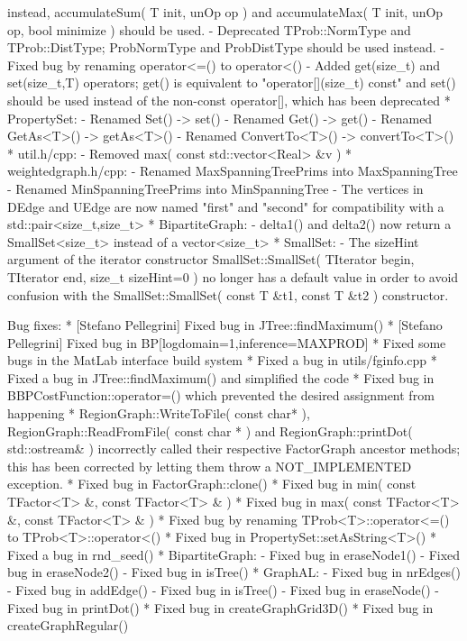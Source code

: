 \begin{DoxyVerbInclude}
    instead, accumulateSum( T init, unOp op ) and
    accumulateMax( T init, unOp op, bool minimize ) should be used.
  - Deprecated TProb::NormType and TProb::DistType;
    ProbNormType and ProbDistType should be used instead.
  - Fixed bug by renaming operator<=() to operator<()
  - Added get(size_t) and set(size_t,T) operators; 
    get() is equivalent to "operator[](size_t) const" and set() should
    be used instead of the non-const operator[], which has been deprecated
* PropertySet:
  - Renamed Set() -> set()
  - Renamed Get() -> get()
  - Renamed GetAs<T>() -> getAs<T>()
  - Renamed ConvertTo<T>() -> convertTo<T>()
* util.h/cpp:
  - Removed max( const std::vector<Real> &v )
* weightedgraph.h/cpp:
  - Renamed MaxSpanningTreePrims into MaxSpanningTree
  - Renamed MinSpanningTreePrims into MinSpanningTree
  - The vertices in DEdge and UEdge are now named "first" and "second"
    for compatibility with a std::pair<size_t,size_t>
* BipartiteGraph:
  - delta1() and delta2() now return a SmallSet<size_t> instead of a vector<size_t>
* SmallSet:
  - The sizeHint argument of the iterator constructor
     SmallSet::SmallSet( TIterator begin, TIterator end, size_t sizeHint=0 )
    no longer has a default value in order to avoid confusion with the
     SmallSet::SmallSet( const T &t1, const T &t2 )
    constructor.

Bug fixes:
* [Stefano Pellegrini] Fixed bug in JTree::findMaximum()
* [Stefano Pellegrini] Fixed bug in BP[logdomain=1,inference=MAXPROD]
* Fixed some bugs in the MatLab interface build system
* Fixed a bug in utils/fginfo.cpp
* Fixed a bug in JTree::findMaximum() and simplified the code
* Fixed bug in BBPCostFunction::operator=() which prevented the desired 
  assignment from happening
* RegionGraph::WriteToFile( const char* ), RegionGraph::ReadFromFile( const char * )
  and RegionGraph::printDot( std::ostream& ) incorrectly called their respective
  FactorGraph ancestor methods; this has been corrected by letting them throw a
  NOT_IMPLEMENTED exception.
* Fixed bug in FactorGraph::clone()
* Fixed bug in min( const TFactor<T> &, const TFactor<T> & )
* Fixed bug in max( const TFactor<T> &, const TFactor<T> & )
* Fixed bug by renaming TProb<T>::operator<=() to TProb<T>::operator<()
* Fixed bug in PropertySet::setAsString<T>()
* Fixed a bug in rnd_seed()
* BipartiteGraph:
  - Fixed bug in eraseNode1()
  - Fixed bug in eraseNode2()
  - Fixed bug in isTree()
* GraphAL:
  - Fixed bug in nrEdges()
  - Fixed bug in addEdge()
  - Fixed bug in isTree()
  - Fixed bug in eraseNode()
  - Fixed bug in printDot()
* Fixed bug in createGraphGrid3D()
* Fixed bug in createGraphRegular()



\end{DoxyVerbInclude}

